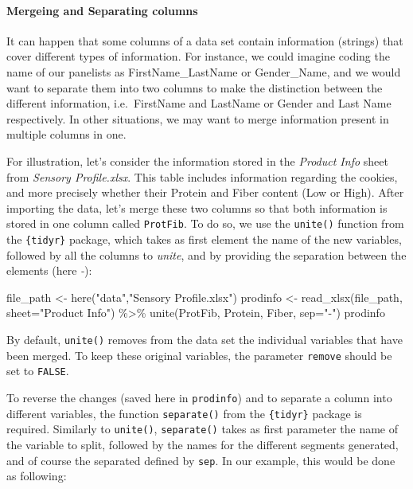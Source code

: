 \documentclass[
]{book}
\newenvironment{Shaded}{\begin{snugshade}}{\end{snugshade}}
\newcommand{\AttributeTok}[1]{\textcolor[rgb]{0.77,0.63,0.00}{#1}}
\newcommand{\FunctionTok}[1]{\textcolor[rgb]{0.00,0.00,0.00}{#1}}
\newcommand{\NormalTok}[1]{#1}
\newcommand{\OtherTok}[1]{\textcolor[rgb]{0.56,0.35,0.01}{#1}}
\newcommand{\SpecialCharTok}[1]{\textcolor[rgb]{0.00,0.00,0.00}{#1}}
\newcommand{\StringTok}[1]{\textcolor[rgb]{0.31,0.60,0.02}{#1}}
\begin{document}
\hypertarget{mergeing-and-separating-columns}{%
\paragraph{Mergeing and Separating columns}\label{mergeing-and-separating-columns}}

It can happen that some columns of a data set contain information (strings) that cover different types of information. For instance, we could imagine coding the name of our panelists as FirstName\_LastName or Gender\_Name, and we would want to separate them into two columns to make the distinction between the different information, i.e.~FirstName and LastName or Gender and Last Name respectively. In other situations, we may want to merge information present in multiple columns in one.

For illustration, let's consider the information stored in the \emph{Product Info} sheet from \emph{Sensory Profile.xlsx}. This table includes information regarding the cookies, and more precisely whether their Protein and Fiber content (Low or High). After importing the data, let's merge these two columns so that both information is stored in one column called \texttt{ProtFib}.
To do so, we use the \texttt{unite()} function from the \texttt{\{tidyr\}} package, which takes as first element the name of the new variables, followed by all the columns to \emph{unite}, and by providing the separation between the elements (here \emph{-}):

\begin{Shaded}
\begin{Highlighting}[]
\NormalTok{file\_path }\OtherTok{\textless{}{-}} \FunctionTok{here}\NormalTok{(}\StringTok{"data"}\NormalTok{,}\StringTok{"Sensory Profile.xlsx"}\NormalTok{) }
\NormalTok{prodinfo }\OtherTok{\textless{}{-}} \FunctionTok{read\_xlsx}\NormalTok{(file\_path, }\AttributeTok{sheet=}\StringTok{"Product Info"}\NormalTok{) }\SpecialCharTok{\%\textgreater{}\%}  
  \FunctionTok{unite}\NormalTok{(ProtFib, Protein, Fiber, }\AttributeTok{sep=}\StringTok{"{-}"}\NormalTok{)}
\NormalTok{prodinfo}
\end{Highlighting}
\end{Shaded}

By default, \texttt{unite()} removes from the data set the individual variables that have been merged. To keep these original variables, the parameter \texttt{remove} should be set to \texttt{FALSE}.

To reverse the changes (saved here in \texttt{prodinfo}) and to separate a column into different variables, the function \texttt{separate()} from the \texttt{\{tidyr\}} package is required. Similarly to \texttt{unite()}, \texttt{separate()} takes as first parameter the name of the variable to split, followed by the names for the different segments generated, and of course the separated defined by \texttt{sep}. In our example, this would be done as following:
\end{document}
